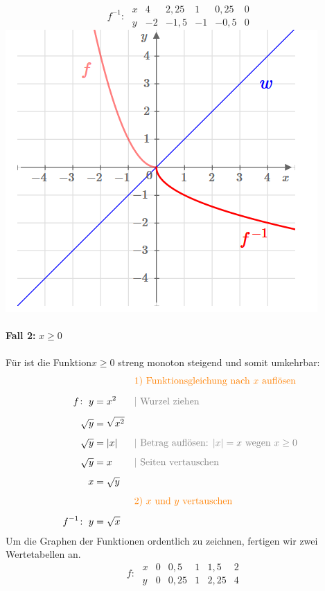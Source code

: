\documentclass[a4paper,10pt]{article}
\begin{document}
\begin{multicols}{3}
    \[f^{-1}\colon\; \begin{array}{r|c|c|c|c|c} x & 4 & 2{,}25 & 1 & 0{,}25 & 0 \\ \hline y & -2 & -1{,}5 & -1 & -0{,}5 & 0 \end{array}\]
    \includegraphics{wurzelfunktion1}\\~\\
    \textbf{Fall 2:} $x \geq 0$\\~\\
    Für ist die Funktion$x \geq 0$ streng monoton steigend und somit umkehrbar:
    \begin{align*} & &&{\color{orange}\text{1) Funktionsgleichung nach $x$ auflösen}} \\[5px] f\colon\; y &= x^2 &&{\color{gray}| \text{ Wurzel ziehen}} \\[5px] \sqrt{y} &= \sqrt{x^2} \\[5px] \sqrt{y} &= |x| &&{\color{gray}| \text{ Betrag auflösen: } |x| = x \text{ wegen } x \geq 0} \\[5px] \sqrt{y} &= x &&{\color{gray}| \text{ Seiten vertauschen}} \\[5px] x &= \sqrt{y} \\[5px] & &&{\color{orange}\text{2) $x$ und $y$ vertauschen}} \\[5px] f^{-1}\colon\; y &= \sqrt{x} \end{align*}
    Um die Graphen der Funktionen ordentlich zu zeichnen, fertigen wir zwei Wertetabellen an.
    \[\phantom{^{-1}}f\colon\; \begin{array}{r|c|c|c|c|c} x & 0 & 0{,}5 & 1 & 1{,}5 & 2 \\ \hline y & 0 & 0{,}25 & 1 & 2{,}25 & 4 \end{array}\]

\end{multicols}
\end{document}
